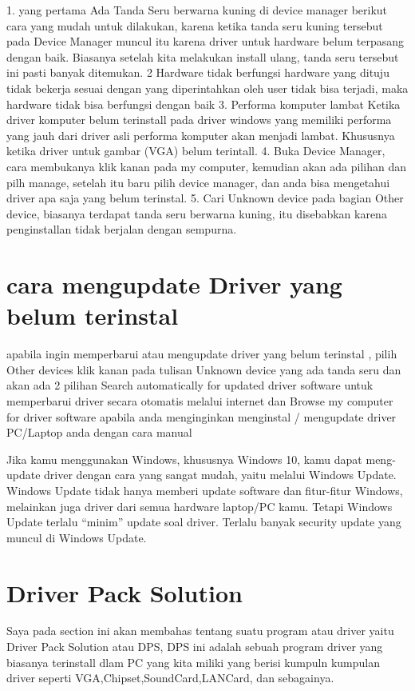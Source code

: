 1. yang pertama Ada Tanda Seru berwarna kuning di device manager
berikut  cara yang mudah untuk dilakukan, karena ketika tanda seru kuning  tersebut pada Device Manager muncul itu karena driver untuk hardware belum terpasang dengan baik. Biasanya setelah kita melakukan install ulang, tanda seru tersebut ini pasti banyak ditemukan. 
2 Hardware tidak berfungsi
 hardware yang dituju tidak  bekerja sesuai dengan yang diperintahkan oleh user tidak bisa terjadi, maka hardware tidak bisa berfungsi dengan baik
3. Performa komputer lambat
Ketika driver komputer belum terinstall pada driver windows yang memiliki performa yang jauh dari driver asli performa komputer akan menjadi lambat. Khususnya ketika driver untuk gambar (VGA) belum terintall. 
4. Buka Device Manager, cara membukanya klik kanan pada my computer, kemudian akan ada pilihan dan pilh manage, setelah itu baru pilih device manager, dan anda bisa mengetahui driver apa saja yang belum terinstal.
5. Cari Unknown device pada bagian Other device, biasanya terdapat tanda seru berwarna kuning, itu disebabkan karena penginstallan tidak berjalan dengan sempurna.

\section {cara mengupdate Driver yang belum terinstal}

apabila ingin memperbarui atau mengupdate driver yang belum terinstal , pilih Other devices klik kanan pada tulisan Unknown device yang ada tanda seru dan akan ada 2 pilihan Search automatically for updated driver software untuk memperbarui driver secara otomatis melalui internet dan Browse my computer for driver software apabila anda menginginkan menginstal / mengupdate driver PC/Laptop anda dengan cara manual

Jika kamu menggunakan Windows, khususnya Windows 10, kamu dapat meng-update driver dengan cara yang sangat mudah, yaitu melalui Windows Update.
Windows Update tidak hanya memberi update software dan fitur-fitur Windows, melainkan juga driver dari semua hardware laptop/PC kamu. Tetapi Windows Update terlalu “minim” update soal driver. Terlalu banyak security update yang muncul di Windows Update.

\section {Driver Pack Solution}

Saya pada section ini akan membahas tentang suatu program atau driver yaitu Driver Pack Solution atau DPS, DPS ini adalah sebuah program driver yang biasanya terinstall dlam PC yang kita miliki yang berisi kumpuln kumpulan driver seperti VGA,Chipset,SoundCard,LANCard, dan sebagainya.
